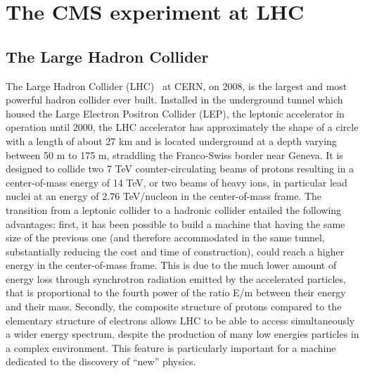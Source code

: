 \chapter{The CMS experiment at LHC}

\section{The Large Hadron Collider}
The Large Hadron Collider (LHC)~\cite{Pettersson:291782}  at CERN,  on 2008, is the largest and most powerful hadron collider ever built. Installed in the
underground tunnel which housed the Large Electron Positron Collider (LEP),
the leptonic accelerator in operation until 2000, the LHC accelerator
has approximately the shape of a circle with a length of about 27 km
and is located underground at a depth varying
between 50 m to 175 m, straddling the Franco-Swiss border near Geneva. It is designed
to collide two 7 TeV counter-circulating beams of protons resulting in a center-of-mass
energy of 14 TeV, or two beams of heavy ions, in particular lead nuclei at an energy of
2.76 TeV/nucleon in the center-of-mass frame.
The transition from a leptonic collider to a hadronic collider entailed the following
advantages: first, it has been possible to build a machine that having the same size of the
previous one (and therefore accommodated in the same tunnel,
substantially reducing the cost and time of construction), could reach
a higher energy in the center-of-mass
frame. This is due to the much lower amount of energy loss through synchrotron radiation
emitted by the accelerated particles, that is proportional to the fourth power of the ratio
E/m between their energy and their mass. Secondly, the composite structure of protons
compared to the elementary structure of electrons allows LHC to be able to access simultaneously a wider energy spectrum, despite the production of many low energies particles in a complex environment. This feature is particularly important for a machine dedicated
to the discovery of “new” physics.

